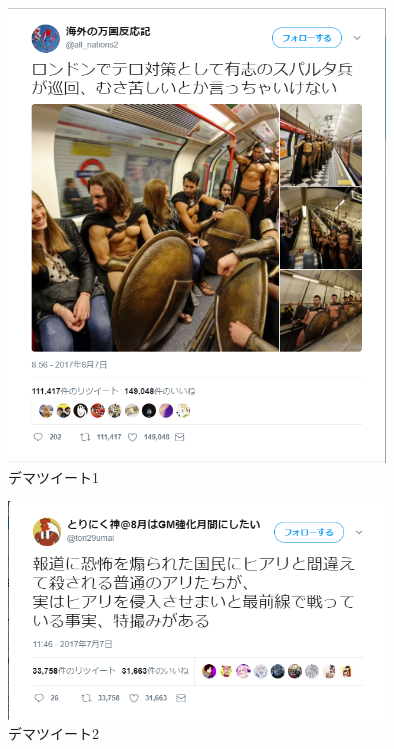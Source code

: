 \begin{figure}[htb]
\centering
\includegraphics[width=10cm]{dema1.png}
\caption{デマツイート1}\label{14}
\end{figure}
\clearpage

\begin{figure}[htb]
\centering
\includegraphics[width=10cm]{dema2.png}
\caption{デマツイート2}\label{15}
\end{figure}
\clearpage

